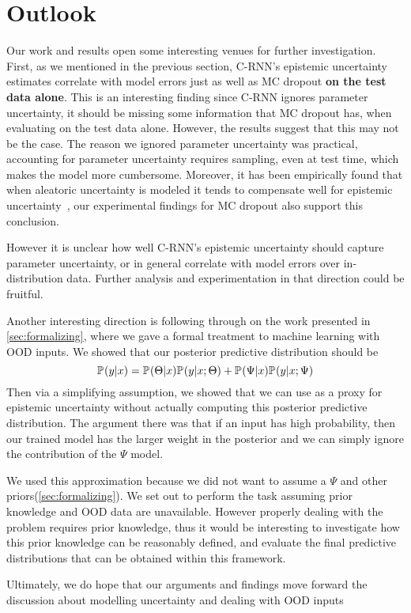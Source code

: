 \documentclass[../main.tex]{subfiles}
\begin{document}
\section{Outlook}

Our work and results open some interesting venues for further investigation. First, as we mentioned in the previous section, C-RNN's epistemic uncertainty estimates correlate with model errors just as well as MC dropout \textbf{on the test data alone}. 
This is an interesting finding since C-RNN ignores parameter uncertainty, it should be missing some information that MC dropout has, when evaluating on the test data alone. However, the results suggest that this may not be the case.
The reason we ignored parameter uncertainty was practical, accounting for parameter uncertainty requires sampling, even at test time, which makes the model more cumbersome. Moreover, it has been empirically found that when aleatoric uncertainty is modeled it tends to compensate well for epistemic uncertainty~\citep{kendall2017uncertainties}, our experimental findings for MC dropout also support this conclusion. 

However it is unclear how well C-RNN's epistemic uncertainty should capture parameter uncertainty, or in general correlate with model errors over in-distribution data. Further analysis and experimentation in that direction could be fruitful. 

Another interesting direction is following through on the work presented in \cref{sec:formalizing}, where we gave a formal treatment to machine learning with OOD inputs. We showed that our posterior predictive distribution should be 
$$
    \mathbb{P}_{}(y|x) = \mathbb{P}_{}(\Theta|x) \mathbb{P}_{}(y| x; \Theta) + \mathbb{P}_{}(\Psi|x) \mathbb{P}_{}(y | x; \Psi)
$$
Then via a simplifying assumption, we showed that we can use  as a proxy for epistemic uncertainty without actually computing this posterior predictive distribution. The argument there was that if an input has high probability, then our trained model has the larger weight in the posterior and we can simply ignore the contribution of the $\Psi$ model. 

We used this approximation because we did not want to assume a $\Psi$ and other priors(\cref{sec:formalizing}). We set out to perform the task assuming prior knowledge and OOD data are unavailable.
However properly dealing with the problem requires prior knowledge, thus it would be interesting to investigate how this prior knowledge can be reasonably defined, and evaluate the final predictive distributions that can be obtained within this framework.

Ultimately, we do hope that our arguments and findings move forward the discussion about modelling uncertainty and dealing with OOD inputs 

\end{document}
